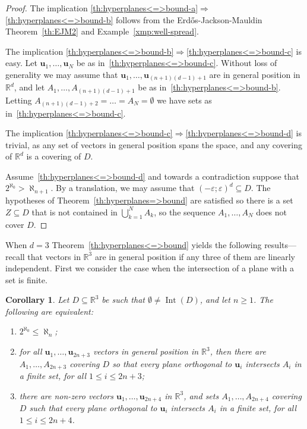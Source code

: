\documentclass[12pt]{amsart}
\DeclareMathOperator{\Int}{Int} 		%
\newcommand{\R}{\mathbb{R}}	%
\newcommand{\IMPLIES}{\Rightarrow }
\theoremstyle{plain}
\newtheorem{corollary}[theorem]{Corollary}
\theoremstyle{definition}
\theoremstyle{remark}
\begin{document}
\begin{proof}
The implication \ref{th:hyperplanes<=>bound-a}\( \IMPLIES \)\ref{th:hyperplanes<=>bound-b} follows from the Erd\H{o}s-Jackson-Mauldin Theorem~\ref{th:EJM2} and Example~\ref{xmp:well-spread}.

\smallskip

The implication \ref{th:hyperplanes<=>bound-b}\( \IMPLIES \)\ref{th:hyperplanes<=>bound-c} is easy.
Let \( \mathbf{u}_1 , \dots , \mathbf{u}_N \) be as in~\ref{th:hyperplanes<=>bound-c}.
Without loss of generality we may assume that \( \mathbf{u}_1 , \dots , \mathbf{u}_{ ( n + 1 ) ( d - 1 ) + 1 } \) are in general position in \( \R^d \), and let \( A_1 , \dots , A_{ ( n + 1 ) ( d - 1 ) + 1 } \) be as in~\ref{th:hyperplanes<=>bound-b}.
Letting \( A_{ ( n + 1 ) ( d - 1 ) + 2} = \dots = A_N = \emptyset \) we have sets as in~\ref{th:hyperplanes<=>bound-c}.

\smallskip

The implication \ref{th:hyperplanes<=>bound-c}\( \IMPLIES \)\ref{th:hyperplanes<=>bound-d} is trivial, as any set of vectors in general position spans the space, and any covering of \( \R^d \) is a covering of \( D \). 

\smallskip

Assume~\ref{th:hyperplanes<=>bound-d} and towards a contradiction suppose that \( 2^{\aleph_0} > \aleph_{ n + 1 } \).
By a translation, we may assume that \( ( - \varepsilon ; \varepsilon )^d \subseteq D \).
The hypotheses of Theorem~\ref{th:hyperplanes=>bound} are satisfied so there is a set \( Z \subseteq D \) that is not contained in \(\bigcup_{ k = 1 }^N A_k \), so the sequence \( A_1 , \dots , A_ N \) does not cover \( D \).
\end{proof}

When \( d = 3 \) Theorem~\ref{th:hyperplanes<=>bound} yields the following results---recall that vectors in \( \R^3 \) are in general position if any three of them are linearly independent.
First we consider the case when the intersection of a plane with a set is finite.

\begin{corollary}\label{cor:hyperplanes=>CH-1}
Let \( D \subseteq \R^3 \) be such that \( \emptyset \neq \Int ( D ) \), and let \( n \geq 1 \).
The following are equivalent:
\begin{enumerate}[label={\upshape (\alph*)}]
\item
 \( 2^{\aleph_0 } \leq \aleph_n \);
\item
for all \( \mathbf{u}_1 , \dots , \mathbf{u}_{ 2 n + 3 } \) vectors in general position in \( \R^3 \), then there are \( A_1 , \dots , A_{ 2 n + 3 } \) covering \( D \) so that every plane orthogonal to \( \mathbf{u}_i \) intersects \( A_i \) in a finite set, for all \( 1 \leq i \leq 2 n + 3 \);
\item
there are non-zero vectors \( \mathbf{u}_1 , \dots , \mathbf{u}_{ 2 n + 4 } \) in \( \R^3\), and sets \( A_1 , \dots , A_{ 2 n + 4 } \) covering \( D \) such that every plane orthogonal to \( \mathbf{u}_i \) intersects \( A_i \) in a finite set, for all \( 1 \leq i \leq 2 n + 4 \).
\end{enumerate}
\end{corollary}
\end{document}

